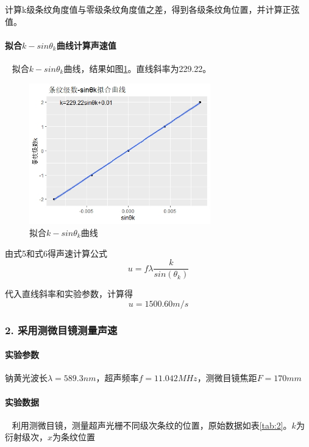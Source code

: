 \documentclass[12pt,a4paper,UTF8]{ctexart}
\begin{document}
		计算k级条纹角度值与零级条纹角度值之差，得到各级条纹角位置，并计算正弦值。
		
		\paragraph{拟合$k-sin\theta_k$曲线计算声速值}~
		\newline
		\indent
		拟合$k-sin\theta_k$曲线，结果如图\ref{fig:1}。直线斜率为229.22。
		\begin{figure}[htbp]
			\centering
			\includegraphics[width=0.7\textwidth]{img//curve1.jpeg}
			\caption{拟合$k-sin\theta_k$曲线}
			\label{fig:1}
		\end{figure}
		
		由式5和式6得声速计算公式
		\begin{equation}\label{eq:5}
			u = f\lambda\frac{k}{sin(\theta_k)}
		\end{equation}
		
		代入直线斜率和实验参数，计算得
		$$
		u = 1500.60 m/s
		$$


\subsubsection*{2. 采用测微目镜测量声速}
		\paragraph{实验参数} 钠黄光波长$\lambda = 589.3 nm$，超声频率$f = 11.042 MHz$，测微目镜焦距$F = 170mm$
		\paragraph{实验数据}~
		\newline
		\indent
		利用测微目镜，测量超声光栅不同级次条纹的位置，原始数据如表\ref{tab:2}。$k$为衍射级次，$x$为条纹位置
\end{document}
